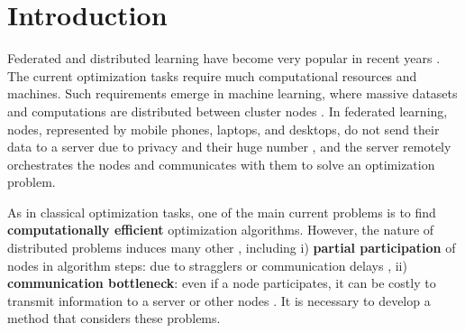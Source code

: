 \documentclass{article}
\title{}
\author{%
  Alexander Tyurin\\
  KAUST\\
  Saudi Arabia\\
  \texttt{alexandertiurin@gmail.com} \\
  \And
  Peter Richt\'{a}rik \\
  KAUST\\
  Saudi Arabia\\
  \texttt{richtarik@gmail.com} \\
}
\begin{document}
\maketitle

\begin{abstract}
\end{abstract}

\section{Introduction}
Federated and distributed learning have become very popular in recent years \citep{konevcny2016federated, mcmahan2017communication}. 
The current optimization tasks require much computational resources and machines. Such requirements emerge in machine learning, where massive datasets and computations are distributed between cluster nodes \citep{lin2017deep, ramesh2021zero}. In federated learning, nodes, represented by mobile phones, laptops, and desktops, do not send their data to a server due to privacy and their huge number \citep{ramaswamy2019federated}, and the server remotely orchestrates the nodes and communicates with them to solve an optimization problem.

As in classical optimization tasks, one of the main current problems is to find \textbf{computationally efficient} optimization algorithms. However, the nature of distributed problems induces many other \citep{kairouz2021advances}, including i) \textbf{partial participation} of nodes in algorithm steps: due to stragglers \citep{li2020federated} or communication delays \citep{vogels2021relaysum}, ii) \textbf{communication bottleneck}: even if a node participates, it can be costly to transmit information to a server or other nodes \citep{alistarh2017qsgd, ramesh2021zero,kairouz2021advances, sapio2019scaling, narayanan2019pipedream}. It is necessary to develop a method that considers these problems.

\end{document}
